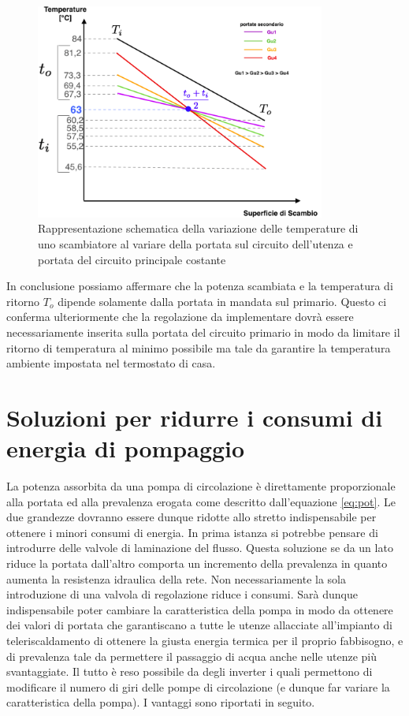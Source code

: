 \documentclass[laurea,oneside,11pt]{USiena_tesiLM}
\begin{document}
\begin{figure}[!ht]
\centering
\includegraphics[width=0.85\textwidth]{figure/pompa_var_utenza} 
\caption{Rappresentazione schematica della variazione delle temperature di uno scambiatore al variare della portata sul circuito dell'utenza e portata del circuito principale costante}
\label{fig:pompa_var_utenza}
\end{figure}

In conclusione possiamo affermare che la potenza scambiata e la temperatura di ritorno $T_o$ dipende solamente dalla portata in mandata sul primario.
Questo ci conferma ulteriormente che la regolazione da implementare dovrà essere necessariamente inserita sulla portata del circuito primario in modo da limitare il ritorno di temperatura al minimo possibile ma tale da garantire la temperatura ambiente impostata nel termostato di casa.


\section{Soluzioni per ridurre i consumi di energia di pompaggio}
La potenza assorbita da una pompa di circolazione è direttamente proporzionale alla portata ed alla prevalenza erogata come descritto dall'equazione \ref{eq:pot}. Le due grandezze dovranno essere dunque ridotte allo stretto indispensabile per ottenere i minori consumi di energia.
In prima istanza si potrebbe pensare di introdurre delle valvole di laminazione del flusso. Questa soluzione se da un lato riduce la portata dall'altro comporta un incremento della prevalenza in quanto aumenta la resistenza idraulica della rete.
Non necessariamente la sola introduzione di una valvola di regolazione riduce i consumi. Sarà dunque indispensabile poter cambiare la caratteristica della pompa in modo da ottenere dei valori di portata che garantiscano a tutte le utenze allacciate all'impianto di teleriscaldamento di ottenere la giusta energia termica per il proprio fabbisogno, e di prevalenza tale da permettere il passaggio di acqua anche nelle utenze più svantaggiate.
Il tutto è reso possibile da degli inverter i quali permettono di modificare il numero di giri delle pompe di circolazione (e dunque far variare la caratteristica della pompa). I vantaggi sono riportati in seguito.
\end{document}
